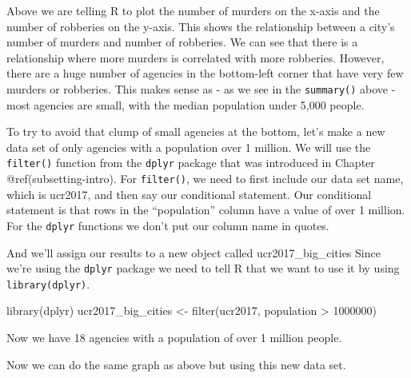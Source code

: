 \documentclass[
  a4paper,
]{krantz}
\makeatletter
\newenvironment{Shaded}{\begin{snugshade}}{\end{snugshade}}
\newcommand{\DecValTok}[1]{\textcolor[rgb]{0.00,0.00,0.81}{#1}}
\newcommand{\FunctionTok}[1]{\textcolor[rgb]{0.00,0.00,0.00}{#1}}
\newcommand{\NormalTok}[1]{#1}
\newcommand{\OtherTok}[1]{\textcolor[rgb]{0.56,0.35,0.01}{#1}}
\newcommand{\SpecialCharTok}[1]{\textcolor[rgb]{0.00,0.00,0.00}{#1}}
\newenvironment{kframe}{%
\medskip{}
\setlength{\fboxsep}{.8em}
 \def\at@end@of@kframe{}%
 \ifinner\ifhmode%
  \def\at@end@of@kframe{\end{minipage}}%
  \begin{minipage}{\columnwidth}%
 \fi\fi%
 \def\FrameCommand##1{\hskip\@totalleftmargin \hskip-\fboxsep
 \colorbox{shadecolor}{##1}\hskip-\fboxsep
     \hskip-\linewidth \hskip-\@totalleftmargin \hskip\columnwidth}%
 \MakeFramed {\advance\hsize-\width
   \@totalleftmargin\z@ \linewidth\hsize
   \@setminipage}}%
 {\par\unskip\endMakeFramed%
 \at@end@of@kframe}
\renewenvironment{Shaded}{\begin{kframe}}{\end{kframe}}
\makeatother
\begin{document}
Above we are telling R to plot the number of murders on the
x-axis and the number of robberies on the y-axis. This shows
the relationship between a city's number of murders and
number of robberies. We can see that there is a relationship
where more murders is correlated with more robberies.
However, there are a huge number of agencies in the
bottom-left corner that have very few murders or robberies.
This makes sense as - as we see in the \texttt{summary()}
above - most agencies are small, with the median population
under 5,000 people.

To try to avoid that clump of small agencies at the bottom,
let's make a new data set of only agencies with a population
over 1 million. We will use the \texttt{filter()} function
from the \texttt{dplyr} package that was introduced in
Chapter @ref(subsetting-intro). For \texttt{filter()}, we
need to first include our data set name, which is ucr2017,
and then say our conditional statement. Our conditional
statement is that rows in the ``population'' column have a
value of over 1 million. For the \texttt{dplyr} functions we
don't put our column name in quotes.

And we'll assign our results to a new object called
ucr2017\_big\_cities Since we're using the \texttt{dplyr}
package we need to tell R that we want to use it by using
\texttt{library(dplyr)}.

\begin{Shaded}
\begin{Highlighting}[]
\FunctionTok{library}\NormalTok{(dplyr)}
\NormalTok{ucr2017\_big\_cities }\OtherTok{\textless{}{-}} \FunctionTok{filter}\NormalTok{(ucr2017, population }\SpecialCharTok{\textgreater{}} \DecValTok{1000000}\NormalTok{)}
\end{Highlighting}
\end{Shaded}

Now we have 18 agencies with a population of over 1 million
people.

Now we can do the same graph as above but using this new
data set.

\begin{Shaded}
\end{Shaded}
\end{document}
